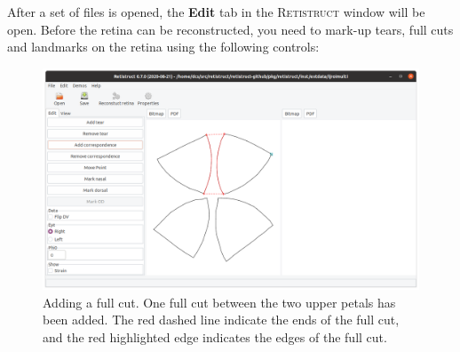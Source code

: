 \documentclass{book}
\begin{document}
After a set of files is opened, the \textbf{Edit} tab in the
\textsc{Retistruct} window will be open. Before the retina can be
reconstructed, you need to mark-up tears, full cuts and
landmarks on the retina using the following controls:

\begin{figure}
  \includegraphics[width=\linewidth]{fullcut}
  \caption{Adding a full cut. One full cut between the two
    upper petals has been added. The red dashed line indicate the ends
    of the full cut, and the red highlighted edge indicates the
    edges of the full cut.}
  \label{retistruct-user-guide:fig:full-cut}
\end{figure}
\end{document}
